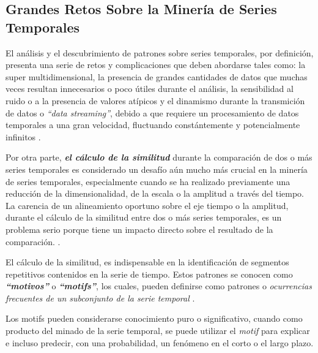 \subsection{Grandes Retos Sobre la Miner\'ia de Series Temporales}
El an\'alisis y el descubrimiento de patrones sobre series temporales, por definici\'on, presenta una serie de retos y complicaciones que deben abordarse tales como: la super multidimensional, la presencia de grandes cantidades de datos que muchas veces resultan innecesarios o poco \'utiles durante el an\'alisis, la sensibilidad al ruido o a la presencia de valores at\'ipicos y el dinamismo durante la transmici\'on de datos o \textit{\enquote{data streaming}}, debido a que requiere un procesamiento de datos temporales a una gran velocidad, fluctuando const\'antemente y potencialmente infinitos \cite{main}.\par
Por otra parte, \textit{\textbf{el c\'alculo de la similitud}} durante la comparaci\'on de dos o m\'as series temporales es considerado un desaf\'io a\'un mucho m\'as crucial en la miner\'ia de series temporales, especialmente cuando se ha realizado previamente una reducci\'on de la dimensionalidad, de la escala o la amplitud a trav\'es del tiempo. La carencia de un alineamiento oportuno sobre el eje tiempo o la amplitud, durante el c\'alculo de la similitud entre dos o m\'as series temporales, es un problema serio porque tiene un impacto directo sobre el resultado de la comparaci\'on. \cite{concepts}.\par
El c\'alculo de la similitud, es indispensable en la identificaci\'on de segmentos repetitivos contenidos en la serie de tiempo. Estos patrones se conocen como \textit{\textbf{\enquote{motivos}}} o \textit{\textbf{\enquote{motifs}}}, los cuales, pueden definirse como patrones o \textit{ocurrencias frecuentes de un subconjunto de la serie temporal} \cite{main}.\par
Los motifs pueden considerarse conocimiento puro o significativo, cuando como producto del minado de la serie temporal, se puede utilizar el \textit{motif} para explicar e incluso predecir, con una probabilidad, un fen\'omeno en el corto o el largo plazo.
